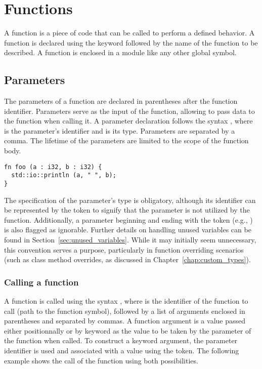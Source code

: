 \section{Functions}%
\label{sec:functions}

A function is a piece of code that can be called to perform a defined behavior.
A function is declared using the keyword  followed by the name of the
function to be described. A function is enclosed in a module like any other
global symbol.

\subsection{Parameters}

The parameters of a function are declared in parentheses after the function
identifier. Parameters serve as the input of the function, allowing to pass data
to the function when calling it. A parameter declaration follows the syntax
, where  is the parameter's identifier and
 is its type. Parameters are separated by a comma. The lifetime of the
parameters are limited to the scope of the function body.

\begin{lstlisting}[style=coloredverbatim]
fn foo (a : i32, b : i32) {
  std::io::println (a, " ", b);
}
\end{lstlisting}

The specification of the parameter's type is obligatory, although its identifier
can be represented by the token \token{\_} to signify that the parameter is not
utilized by the function. Additionally, a parameter beginning and ending with
the token \token{\_} (e.g., ) is also flagged as ignorable. Further
details on handling unused variables can be found in
Section~\ref{sec:unused_variables}. While it may initially seem unnecessary, this
convention serves a purpose, particularly in function overriding scenarios (such
as class method overrides, as discussed in Chapter~\ref{chap:custom_types}).

\subsubsection {Calling a function}

A function is called using the syntax , where
 is the identifier of the function to call (path to the function
symbol), followed by a list of arguments enclosed in parentheses and separated
by commas. A function argument is a value passed either positionnally or by
keyword as the value to be taken by the parameter of the function when called.
To construct a keyword argument, the parameter identifier is used and associated
with a value using the \token{->} token. The following example shows the call
of the function  using both possibilities.

